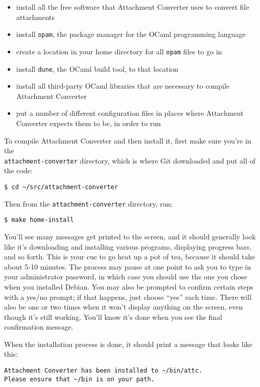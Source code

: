 \documentclass[11pt]{article}
\begin{document}
\begin{itemize}
\item install all the free software that Attachment Converter uses to
convert file attachments
\item install \texttt{opam}, the package manager for the OCaml programming language
\item create a location in your home directory for all \texttt{opam} files to go in
\item install \texttt{dune}, the OCaml build tool, to that location
\item install all third-party OCaml libraries that are necessary to
compile Attachment Converter
\item put a number of different configuration files in places where
Attachment Converter expects them to be, in order to run
\end{itemize}

To compile Attachment Converter and then install it, first make sure
you're in the \\ \texttt{attachment-converter} directory, which is
where Git downloaded and put all of the code:

\begin{verbatim}
$ cd ~/src/attachment-converter
\end{verbatim}

Then from the \texttt{attachment-converter} directory, run:

\begin{verbatim}
$ make home-install
\end{verbatim}

You'll see many messages get printed to the screen, and it should
generally look like it's downloading and installing various programs,
displaying progress bars, and so forth.  This is your cue to go heat
up a pot of tea, because it should take about 5-10 minutes.  The
process may pause at one point to ask you to type in your
administrator password, in which case you should use the one you chose
when you installed Debian.  You may also be prompted to confirm
certain steps with a yes/no prompt; if that happens, just choose ``yes''
each time.  There will also be one or two times when it won't display
anything on the screen, even though it's still working.  You'll know
it's done when you see the final confirmation message.

When the installation process is done, it should print a message that
looks like this:

\begin{verbatim}
Attachment Converter has been installed to ~/bin/attc.
Please ensure that ~/bin is on your path.
\end{verbatim}
\end{document}
